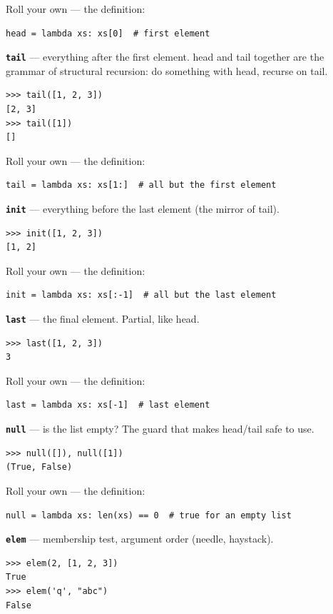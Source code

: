 \documentclass[10pt,letterpaper]{article}
\begin{document}
Roll your own --- the definition:

\begin{lstlisting}[style=ex]
head = lambda xs: xs[0]  # first element
\end{lstlisting}
\textbf{\texttt{tail}} --- everything after the first element. head and tail together are the grammar of structural recursion: do something with head, recurse on tail.
\begin{lstlisting}[style=ex]
>>> tail([1, 2, 3])
[2, 3]
>>> tail([1])
[]
\end{lstlisting}

Roll your own --- the definition:

\begin{lstlisting}[style=ex]
tail = lambda xs: xs[1:]  # all but the first element
\end{lstlisting}
\textbf{\texttt{init}} --- everything before the last element (the mirror of tail).
\begin{lstlisting}[style=ex]
>>> init([1, 2, 3])
[1, 2]
\end{lstlisting}

Roll your own --- the definition:

\begin{lstlisting}[style=ex]
init = lambda xs: xs[:-1]  # all but the last element
\end{lstlisting}
\textbf{\texttt{last}} --- the final element. Partial, like head.
\begin{lstlisting}[style=ex]
>>> last([1, 2, 3])
3
\end{lstlisting}

Roll your own --- the definition:

\begin{lstlisting}[style=ex]
last = lambda xs: xs[-1]  # last element
\end{lstlisting}
\textbf{\texttt{null}} --- is the list empty? The guard that makes head/tail safe to use.
\begin{lstlisting}[style=ex]
>>> null([]), null([1])
(True, False)
\end{lstlisting}

Roll your own --- the definition:

\begin{lstlisting}[style=ex]
null = lambda xs: len(xs) == 0  # true for an empty list
\end{lstlisting}
\textbf{\texttt{elem}} --- membership test, argument order (needle, haystack).
\begin{lstlisting}[style=ex]
>>> elem(2, [1, 2, 3])
True
>>> elem('q', "abc")
False
\end{lstlisting}
\end{document}
